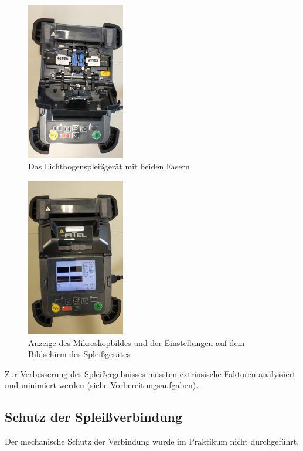 \begin{figure}[H]
\centering
\includegraphics[width=0.382\textwidth]{graphics/spleisen.jpg}
\caption{Das Lichtbogenspleißgerät mit beiden Fasern}
\end{figure}

\begin{figure}[H]
\centering
\includegraphics[width=0.382\textwidth]{graphics/spleisen2.jpg}
\caption{Anzeige des Mikroskopbildes und der Einstellungen auf dem Bildschirm des Spleißgerätes}
\end{figure}

Zur Verbesserung des Spleißergebnisses müssten extrinsische Faktoren analyisiert und minimiert werden (siehe Vorbereitungsaufgaben).

\subsection{Schutz der Spleißverbindung}
Der mechanische Schutz der Verbindung wurde im Praktikum nicht durchgeführt.

